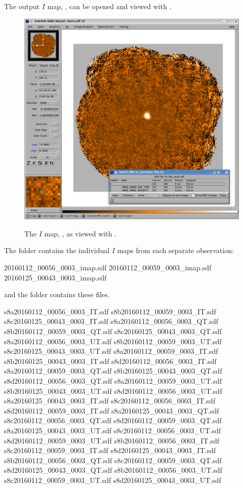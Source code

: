 The output $I$ map, , can be opened and viewed with \GAIA.

\begin{figure}[t!]
\begin{center}
\includegraphics[width=0.8\linewidth]{sc22-gaia-view-iauto.png}
\label{fig:gaia-iauto}
\caption [$I$ map in GAIA]{
  \small The $I$ map, , as viewed with \GAIA.
}
\end{center}
\end{figure}

The  folder contains the individual $I$ maps from each separate
observation:

\begin{terminalv}
20160112_00056_0003_imap.sdf  20160112_00059_0003_imap.sdf  20160125_00043_0003_imap.sdf
\end{terminalv}

and the  folder contains these files.

\begin{terminalv}
s8a20160112_00056_0003_IT.sdf  s8b20160112_00059_0003_IT.sdf  s8c20160125_00043_0003_IT.sdf
s8a20160112_00056_0003_QT.sdf  s8b20160112_00059_0003_QT.sdf  s8c20160125_00043_0003_QT.sdf
s8a20160112_00056_0003_UT.sdf  s8b20160112_00059_0003_UT.sdf  s8c20160125_00043_0003_UT.sdf
s8a20160112_00059_0003_IT.sdf  s8b20160125_00043_0003_IT.sdf  s8d20160112_00056_0003_IT.sdf
s8a20160112_00059_0003_QT.sdf  s8b20160125_00043_0003_QT.sdf  s8d20160112_00056_0003_QT.sdf
s8a20160112_00059_0003_UT.sdf  s8b20160125_00043_0003_UT.sdf  s8d20160112_00056_0003_UT.sdf
s8a20160125_00043_0003_IT.sdf  s8c20160112_00056_0003_IT.sdf  s8d20160112_00059_0003_IT.sdf
s8a20160125_00043_0003_QT.sdf  s8c20160112_00056_0003_QT.sdf  s8d20160112_00059_0003_QT.sdf
s8a20160125_00043_0003_UT.sdf  s8c20160112_00056_0003_UT.sdf  s8d20160112_00059_0003_UT.sdf
s8b20160112_00056_0003_IT.sdf  s8c20160112_00059_0003_IT.sdf  s8d20160125_00043_0003_IT.sdf
s8b20160112_00056_0003_QT.sdf  s8c20160112_00059_0003_QT.sdf  s8d20160125_00043_0003_QT.sdf
s8b20160112_00056_0003_UT.sdf  s8c20160112_00059_0003_UT.sdf  s8d20160125_00043_0003_UT.sdf
\end{terminalv}


